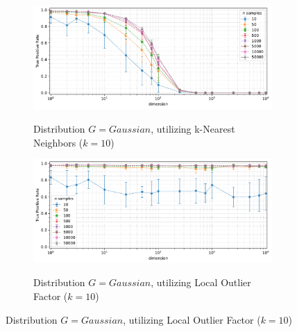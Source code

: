 \begin{figure}[t]
    \centering
    \vspace{-0.75em}
    \begin{subfigure}[b]{0.9\textwidth}
        \centering
        \caption{\small Distribution $G = Gaussian$, utilizing k-Nearest Neighbors ($k=10$)}
        \includegraphics[width=\textwidth]{images/overlapping/trend-distributions-sens_99(dimension)-distance_1-distribution_gaussian-model_kNN-10-samples_10,50,100,500,1000,5000,10000,50000-aggregated.pdf}
        \label{fig:tpr-gaussian-knn}
    \end{subfigure}

    \vspace{-0.75em}
    \begin{subfigure}[b]{0.9\textwidth}
        \centering
        \caption{\small Distribution $G = Gaussian$, utilizing Local Outlier Factor ($k=10$)}
        \includegraphics[width=\textwidth]{images/overlapping/trend-distributions-sens_99(dimension)-distance_1-distribution_gaussian-model_LOF-10-samples_10,50,100,500,1000,5000,10000,50000-aggregated.pdf}
        \label{fig:tpr-gaussian-lof}
    \end{subfigure}


\end{figure}
